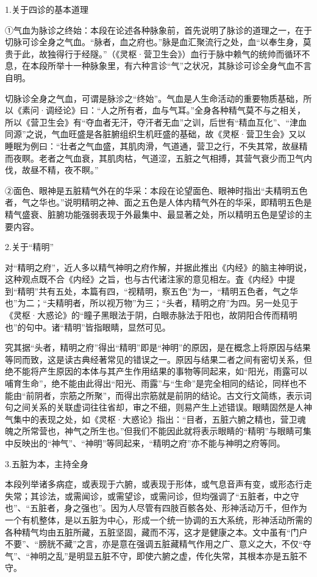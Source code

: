 \documentclass[12pt]{ctexbook}
\begin{document}

1.关于四诊的基本道理

①气血为脉诊之终始：本段在论述各种脉象前，首先说明了脉诊的道理之一，在于切脉可诊全身之气血。“脉者，血之府也。”脉是血汇聚流行之处，血“以奉生身，莫贵于此，故独得行于经隧。”（《灵枢·营卫生会》）血行于脉中赖气的统帅而循环不息，在本段所举十一种脉象里，有六种言诊“气”之状况，其脉诊可诊全身气血不言自明。

切脉诊全身之气血，可谓是脉沴之“终始”。气血是人生命活动的重要物质基础，所以《素问·调经论》曰：“人之所有者，血与气耳。”全身各种精气莫不与之相关，所以《营卫生会》有“夺血者无汗，夺汗者无血”之训，后世有“精血互化”、“津血同源”之说，气血旺盛是各脏腑组织生机旺盛的基础，故《灵枢·营卫生会》又以睡眠为例曰：“壮者之气血盛，其肌肉滑，气道通，营卫之行，不失其常，故昼精而夜瞑。老者之气血衰，其肌肉枯，气道涩，五脏之气相搏，其营气衰少而卫气内伐，故昼不精，夜不瞑。”

②面色、眼神是五脏精气外在的华采：本段在论望面色、眼神时指出“夫精明五色者，气之华也。”说明精明之神、面之五色是人体内精气外在的华采，即精明五色是精气盛衰、脏腑功能强弱表现于外最集中、最显著之处，所以精明五色是望诊的主要内容。

2.关于“精明”

对“精明之府”，近人多以精气神明之府作解，并据此推出《内经》的脑主神明说，这种观点既不合《内经》之旨，也与古代诸注家的意见相左。査《内经》中提到“精明”共有五处，本篇有四，“视精明，察五色”为一，“精明五色者，气之华也”为二；“夫精明者，所以视万物”为三；“头者，精明之府”为四。另一处见于《灵枢·大惑论》的“瞳子黑眼法于阴，白眼赤脉法于阳也，故阴阳合传而精明也”的句中。诸“精明”皆指眼睛，显然可见。

究其据“头者，精明之府”得出“精明”即是“神明”的原因，是在概念上将原因与结果等同而致，这是读古典经著常见的错误之一。原因与结果二者之间有密切关系，但绝不能将产生原因的本体与其产生作用结果的事物等同起来，如“阳光，雨露可以哺育生命”，绝不能由此得出“阳光、雨露”与“生命”是完全相同的结论，同样也不能由“前阴者，宗筋之所聚”，而得出宗筋就是前阴的结论。古文行文简练，表示词句之间关系的关联虚词往往省却，审之不细，则易产生上述错误。眼睛固然是人神气集中的表现之处，如《灵枢·大惑论》指出：“目者，五脏六腑之精也，营卫魂魄之所常营也，神气之所生也。”但我们不能因此就将表示眼睛的“精明”与眼睛可集中反映出的“神气”、“神明”等同起来，“精明之府”亦不能与神明之府等同。

3.五脏为本，主持全身

本段列举诸多病症，或表现于六腑，或表现于形体，或气息音声有变，或形态行走失常；其诊法，或需闻诊，或需望诊，或需问诊，但均强调了“五脏者，中之守也”、“五脏者，身之强也”。因为人尽管有四肢百骸各处、形神活动万千，但作为一个有机整体，是以五脏为中心，形成一个统一协调的五大系统，形神活动所需的各种精气均由五脏所藏，五脏坚固，藏而不泻，这才是健康之本。文中虽有“门户不要”、“膀胱不藏”之言，亦是意在强调五脏藏精气作用之广、意义之大，不仅“夺气”、“神明之乱”是明显五脏不守，即使六腑之虚，传化失常，其根本亦是五脏不守。
\end{document}
